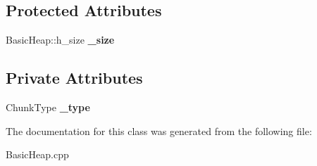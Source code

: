 \subsection*{Protected Attributes}
\begin{DoxyCompactItemize}
\item 
\mbox{\label{class_internal_1_1_chunk_abc79836afba4e11ab3a9bcad0f8834b5}} 
Basic\+Heap\+::h\+\_\+size {\bfseries \+\_\+size}
\end{DoxyCompactItemize}
\subsection*{Private Attributes}
\begin{DoxyCompactItemize}
\item 
\mbox{\label{class_internal_1_1_chunk_a2664fddcaeae17b93db51b0565e6df89}} 
Chunk\+Type {\bfseries \+\_\+type}
\end{DoxyCompactItemize}


The documentation for this class was generated from the following file\+:\begin{DoxyCompactItemize}
\item 
Basic\+Heap.\+cpp\end{DoxyCompactItemize}
